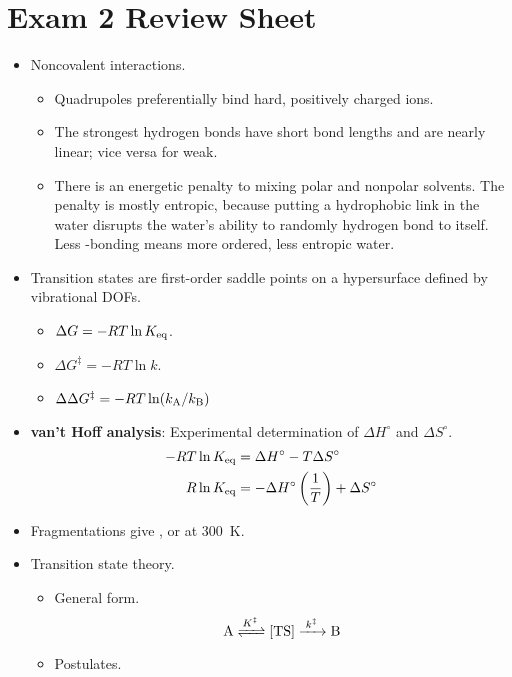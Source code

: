 \documentclass[../notes.tex]{subfiles}
\begin{document}
\section{Exam 2 Review Sheet}
\begin{itemize}
    \item {}Noncovalent interactions.
    \begin{itemize}
        \item Quadrupoles preferentially bind hard, positively charged ions.
        \item The strongest hydrogen bonds have short bond lengths and are nearly linear; vice versa for weak.
        \item There is an energetic penalty to mixing polar and nonpolar solvents. The penalty is mostly entropic, because putting a hydrophobic link in the water disrupts the water's ability to randomly hydrogen bond to itself. Less -bonding means more ordered, less entropic water.
    \end{itemize}
    \item Transition states are first-order saddle points on a hypersurface defined by vibrational DOFs.
    \begin{itemize}
        \item $\Delta G=-RT\ln K_\textup{eq}$.
        \item $\Delta G^\ddagger=-RT\ln k$.
        \item $\Delta\Delta G^\ddagger=-RT\ln(k_{\ce{A}}/k_{\ce{B}})$
    \end{itemize}
    \item \textbf{van't Hoff analysis}: Experimental determination of $\Delta H^\circ$ and $\Delta S^\circ$.
    \begin{align*}
        -RT\ln K_\textup{eq} &= \Delta H^\circ-T\Delta S^\circ\\
        R\ln K_\textup{eq} &= -\Delta H^\circ\left( \frac{1}{T} \right)+\Delta S^\circ
    \end{align*}
    \item Fragmentations give , or  at \SI{300}{\kelvin}.
    \item Transition state theory.
    \begin{itemize}
        \item General form.
        \begin{equation*}
            \ce{A <=>[$K^\ddagger$] [TS] ->[$k^\ddagger$] B}
        \end{equation*}
        \item Postulates.

\end{itemize}
\end{itemize}
\end{document}
